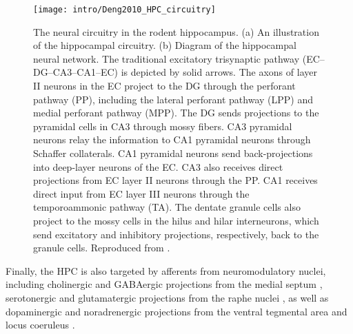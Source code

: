 \begin{figure}
	\centering
	\texttt{[image: intro/Deng2010\_HPC\_circuitry]}
	\caption[The neural circuitry in the rodent hippocampus]{The neural circuitry in the rodent hippocampus.
	(a) An illustration of the hippocampal circuitry.
	(b) Diagram of the hippocampal neural network. The traditional excitatory trisynaptic pathway (\ac{EC}--\ac{DG}--CA3--CA1--EC) is depicted by solid arrows. The axons of layer II neurons in the \ac{EC} project to the \ac{DG} through the perforant pathway (PP), including the lateral perforant pathway (LPP) and medial perforant pathway (MPP). The \ac{DG} sends projections to the pyramidal cells in CA3 through mossy fibers. CA3 pyramidal neurons relay the information to CA1 pyramidal neurons through Schaffer collaterals. CA1 pyramidal neurons send back-projections into deep-layer neurons of the EC. CA3 also receives direct projections from EC layer II neurons through the PP. CA1 receives direct input from EC layer III neurons through the temporoammonic pathway (TA). The dentate granule cells also project to the mossy cells in the hilus and hilar interneurons, which send excitatory and inhibitory projections, respectively, back to the granule cells. 
	Reproduced from \citet{Deng2010}.}
	\label{fig:intro:memory:HPC_circuitry}
\end{figure}

Finally, the \ac{HPC} is also targeted by afferents from neuromodulatory nuclei, including cholinergic and GABAergic projections from the medial septum  \citep{Klausberger2008}, serotonergic and glutamatergic projections from the raphe nuclei \citep{Varga2009}, as well as dopaminergic and noradrenergic projections from the ventral tegmental area \citep{Gasbarri1997} and locus coeruleus \citep{Foote1983}.

